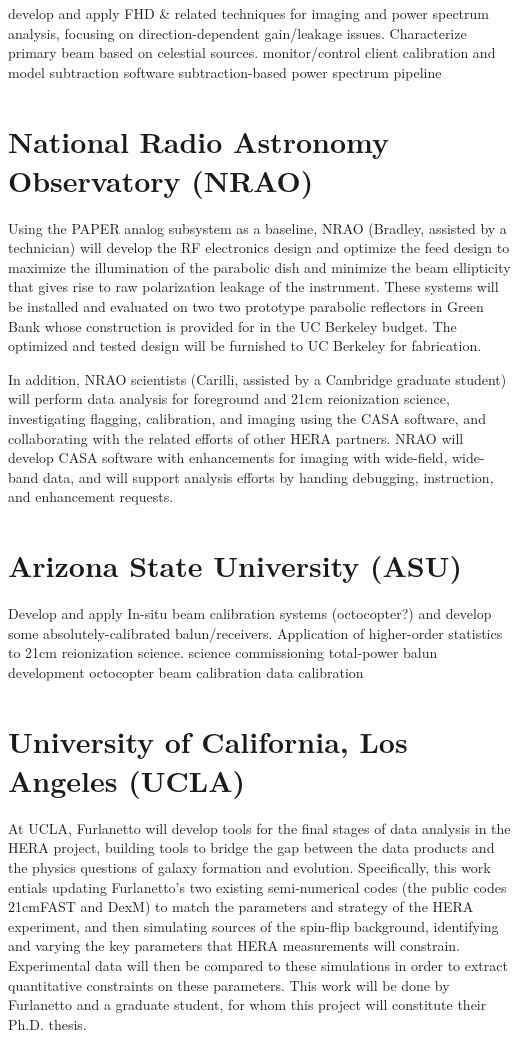 \documentclass[preprint]{aastex}
\begin{document}
develop and apply FHD \& related techniques for imaging and power spectrum
analysis, focusing on direction-dependent gain/leakage issues.  Characterize
primary beam based on celestial sources.  monitor/control client calibration
and model subtraction software subtraction-based power spectrum pipeline

\section*{National Radio Astronomy Observatory (NRAO)}

Using the PAPER analog subsystem as a baseline, NRAO (Bradley, assisted by a
technician) will develop the RF electronics design and optimize the feed design
to maximize the illumination of the parabolic dish and minimize the beam
ellipticity that gives rise to raw polarization leakage of the instrument.
These systems will be installed and evaluated on two two prototype parabolic
reflectors in Green Bank whose construction is provided for in the UC Berkeley
budget.  The optimized and tested design will be furnished to UC Berkeley for
fabrication.

In addition, NRAO scientists (Carilli, assisted by a Cambridge graduate
student) will perform data analysis for foreground and 21cm reionization
science, investigating flagging, calibration, and imaging using the CASA
software, and collaborating with the related efforts of other HERA partners.
NRAO will develop CASA software with enhancements for imaging with wide-field,
wide-band data, and will support analysis efforts by handing debugging,
instruction, and enhancement requests.

\section*{Arizona State University (ASU)}

Develop and apply In-situ beam calibration systems (octocopter?) and develop
some absolutely-calibrated balun/receivers.   Application of higher-order
statistics to 21cm reionization science.  science commissioning total-power
balun development octocopter beam calibration data calibration


\section*{University of California, Los Angeles (UCLA)}

At UCLA, Furlanetto will develop tools for the final stages of data analysis in the HERA
project, building tools to bridge the gap between the data products and the
physics questions of galaxy formation and evolution. Specifically, this work
entials updating Furlanetto’s two existing semi-numerical codes
(the public codes 21cmFAST and DexM) to match the parameters and 
strategy of the HERA experiment, and then
simulating sources of the spin-flip background, identifying and
varying the key parameters that HERA measurements will constrain.
Experimental data will then be compared to these simulations in order to
extract quantitative constraints on these parameters. This work will be done by
Furlanetto and a graduate student, for whom this project will constitute their
Ph.D. thesis.
\end{document}
